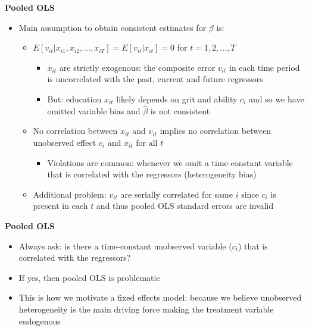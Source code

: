 \documentclass{beamer}
\begin{document}
\begin{frame}[plain]
	\begin{center}
	\textbf{Pooled OLS}
	\end{center}
	
	\begin{itemize}
	\item Main assumption to obtain consistent estimates for $\beta$ is:
		\begin{itemize}
		\item $E[v_{it} | x_{i1},x_{i2}, \dots, x_{iT}] = E[v_{it} | x_{it}] = 0$ for $t=1,2,\dots, T$
			\begin{itemize}
			\item $x_{it}$ are strictly exogenous: the composite error $v_{it}$ in each time period is uncorrelated with the past, current and future regressors
			\item But: education $x_{it}$ likely depends on grit and ability $c_i$ and so we have omitted variable bias and $\widehat{\beta}$ is not consistent
			\end{itemize}
		\item No correlation between $x_{it}$ and $v_{it}$ implies no correlation between unobserved effect $c_i$ and $x_{it}$ for all $t$
			\begin{itemize}
			\item Violations are common: whenever we omit a time-constant variable that is correlated with the regressors (heterogeneity bias)
			\end{itemize}
		\item Additional problem: $v_{it}$ are serially correlated for same $i$ since $c_i$ is present in each $t$ and thus pooled OLS standard errors are invalid
		\end{itemize}
	\end{itemize}
\end{frame}

\begin{frame}[plain]
	\begin{center}
	\textbf{Pooled OLS}
	\end{center}
	
	\begin{itemize}
	\item Always ask: is there a time-constant unobserved variable ($c_i$) that is correlated with the regressors?  
	\item If yes, then pooled OLS is problematic
	\item This is how we motivate a fixed effects model: because we believe unobserved heterogeneity is the main driving force making the treatment variable endogenous
	\end{itemize}
\end{frame}
\end{document}
